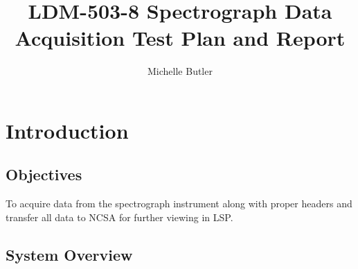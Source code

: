 \documentclass[DM,lsstdraft,STR,toc]{lsstdoc}
\begin{document}
\def\milestoneName{Spectrograph Data Acquisition}
\def\milestoneId{LDM-503-8}
\def\product{Data Management}


\title{ LDM-503-8 Spectrograph Data Acquisition Test Plan and Report}
\setDocRef{\lsstDocType-\lsstDocNum}
\date{\vcsdate}
\author{ Michelle Butler }






\maketitle

\section{Introduction}
\label{sect:intro}


\subsection{Objectives}
\label{sect:objectives}

To acquire data from the spectrograph instrument along with proper
headers and transfer all data to NCSA for further viewing in LSP. ~



\subsection{System Overview}
\label{sect:systemoverview}
\end{document}
